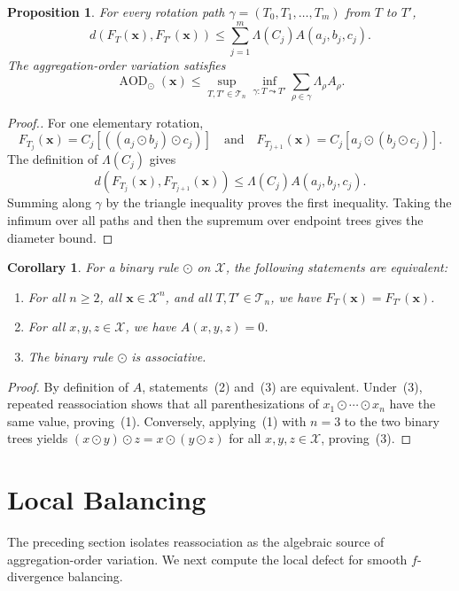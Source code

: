 \documentclass[11pt]{article}
\theoremstyle{plain}
\newtheorem{proposition}[theorem]{Proposition}
\newtheorem{corollary}[theorem]{Corollary}
\theoremstyle{definition}
\theoremstyle{definition}
\newcommand{\X}{\mathcal X}
\newcommand{\BT}{\mathcal T}
\newcommand{\AOD}{\operatorname{AOD}}
\newcommand{\op}{\odot}
\begin{document}
\begin{proposition}\label{prop:assoc}
For every rotation path $\gamma=(T_0,T_1,\ldots,T_m)$ from $T$ to $T'$,
\[
d(F_T(\mathbf{x}),F_{T'}(\mathbf{x}))
\le
\sum_{j=1}^{m}\Lambda(C_j)A(a_j,b_j,c_j).
\]
The aggregation-order variation satisfies
\[
\AOD_{\op}(\mathbf{x})\le
\sup_{T,T'\in\BT_n}\inf_{\gamma:T\leadsto T'}
\sum_{\rho\in\gamma}\Lambda_\rho A_\rho .
\]
\end{proposition}

\begin{proof}[Proof.]
For one elementary rotation,
\[F_{T_j}(\mathbf{x})=C_j[((a_j\op b_j)\op c_j)]\quad\text{and}\quad
F_{T_{j+1}}(\mathbf{x})=C_j[a_j\op(b_j\op c_j)].
\]
The definition of $\Lambda(C_j)$ gives
\[
d(F_{T_j}(\mathbf{x}),F_{T_{j+1}}(\mathbf{x}))\le \Lambda(C_j)A(a_j,b_j,c_j).
\]
Summing along $\gamma$ by the triangle inequality proves the first inequality. Taking the infimum over all paths and then the supremum over endpoint trees gives the diameter bound.
\end{proof}

\begin{corollary}\label{cor:assoc}
For a binary rule $\op$ on $\X$, the following statements are equivalent:
\begin{enumerate}
\item For all $n\ge2$, all $\mathbf{x}\in\X^n$, and all $T,T'\in\BT_n$, we have
$F_T(\mathbf{x})=F_{T'}(\mathbf{x})$.
\item For all $x,y,z\in\X$, we have $A(x,y,z)=0$.
\item The binary rule $\op$ is associative.
\end{enumerate}
\end{corollary}

\begin{proof}
By definition of $A$, statements~(2) and~(3) are equivalent. Under~(3),
repeated reassociation shows that all parenthesizations of
$x_1\op\cdots\op x_n$ have the same value, proving~(1). Conversely,
applying~(1) with $n=3$ to the two binary trees yields
$(x\op y)\op z=x\op(y\op z)$ for all $x,y,z\in\X$, proving~(3).
\end{proof}




\section{Local Balancing}\label{sec:local}

The preceding section isolates reassociation as the algebraic source of aggregation-order variation. We next compute the local defect for smooth $f$-divergence balancing. 
\end{document}
